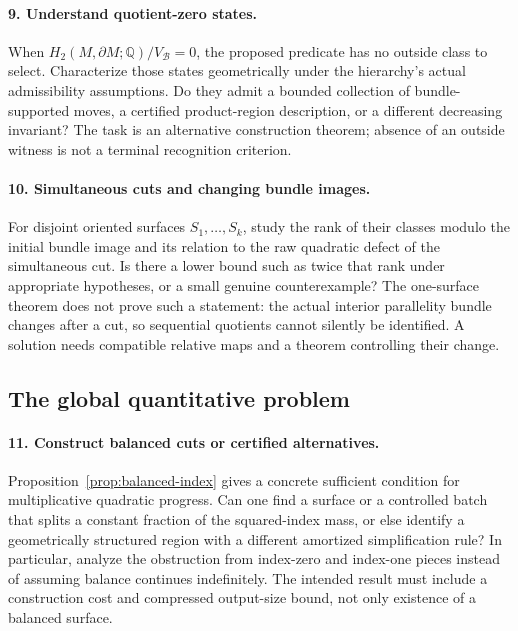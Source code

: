 \paragraph{9. Understand quotient-zero states.}
When $H_2(M,\partial M;\mathbb Q)/V_{\mathcal B}=0$, the proposed predicate
has no outside class to select. Characterize those states geometrically
under the hierarchy's actual admissibility assumptions. Do they admit a
bounded collection of bundle-supported moves, a certified product-region
description, or a different decreasing invariant? The task is an
alternative construction theorem; absence of an outside witness is not
a terminal recognition criterion.

\paragraph{10. Simultaneous cuts and changing bundle images.}
For disjoint oriented surfaces $S_1,\ldots,S_k$, study the rank of their
classes modulo the initial bundle image and its relation to the raw
quadratic defect of the simultaneous cut. Is there a lower bound such as
twice that rank under appropriate hypotheses, or a small genuine
counterexample? The one-surface theorem does not prove such a statement:
the actual interior parallelity bundle changes after a cut, so sequential
quotients cannot silently be identified. A solution needs compatible
relative maps and a theorem controlling their change.

\subsection{The global quantitative problem}

\paragraph{11. Construct balanced cuts or certified alternatives.}
Proposition~\ref{prop:balanced-index} gives a concrete sufficient condition
for multiplicative quadratic progress. Can one find a surface or a
controlled batch that splits a constant fraction of the squared-index
mass, or else identify a geometrically structured region with a different
amortized simplification rule? In particular, analyze the obstruction from
index-zero and index-one pieces instead of assuming balance continues
indefinitely. The intended result must include a construction cost and
compressed output-size bound, not only existence of a balanced surface.

